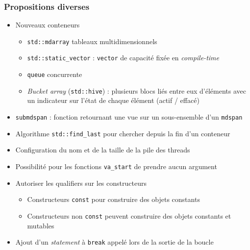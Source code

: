 \documentclass[C++.tex]{subfiles}
\begin{document}
\begin{frame}[fragile]
	\frametitle{Propositions diverses}
	\begin{itemize}
		\item Nouveaux conteneurs
		\begin{itemize}
			\item \lstinline|std::mdarray| tableaux multidimensionnels
			
			
			\item \lstinline|std::static_vector| : \lstinline|vector| de capacité fixée en \textit{compile-time}


			\item \lstinline|queue| concurrente
			\item \textit{Bucket array} (\lstinline|std::hive|) : plusieurs blocs liés entre eux d'éléments  avec un indicateur sur l'état de chaque élément (actif / effacé)
		\end{itemize}
		\item \lstinline|submdspan| : fonction retournant une vue sur un sous-ensemble d'un \lstinline|mdspan|
		\item Algorithme \lstinline|std::find_last| pour chercher depuis la fin d'un conteneur
		\item Configuration du nom et de la taille de la pile des threads
		\item Possibilité pour les fonctions \lstinline|va_start| de prendre aucun argument
		\item Autoriser les qualifiers sur les constructeurs
		\begin{itemize}
			\item Constructeurs \lstinline|const| pour construire des objets constants
			\item Constructeurs non \lstinline|const| peuvent construire des objets constants et mutables
		\end{itemize}
		\item Ajout d'un \textit{statement} à \lstinline|break| appelé lors de la sortie de la boucle


	\end{itemize}
\end{frame}
\end{document}

